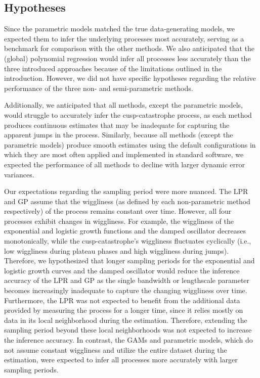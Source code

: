 \documentclass[man, floatsintext]{apa7}
\begin{document}
\subsection{Hypotheses}

Since the parametric models matched the true data-generating models, we
expected them to infer the underlying processes most accurately, serving as a
benchmark for comparison with the other methods. We also anticipated that the
(global) polynomial regression would infer all processes less accurately than
the three introduced approaches because of the limitations outlined in the
introduction. However, we did not have specific hypotheses regarding the
relative performance of the three non- and semi-parametric methods.

Additionally, we anticipated that all methods, except the parametric models,
would struggle to accurately infer the cusp-catastrophe process, as each method
produces continuous estimates that may be inadequate for capturing the apparent
jumps in the process. Similarly, because all methods (except the parametric
models) produce smooth estimates using the default configurations in which they
are most often applied and implemented in standard software, we expected the
performance of all methods to decline with larger dynamic error variances.

Our expectations regarding the sampling period were more nuanced. The LPR and
GP assume that the wiggliness (as defined by each non-parametric method
respectively) of the process remains constant over time. However, all four
processes exhibit changes in wiggliness. For example, the wiggliness of the
exponential and logistic growth functions and the damped oscillator decreases
monotonically, while the cusp-catastrophe's wiggliness fluctuates cyclically
(i.e., low wiggliness during plateau phases and high wiggliness during jumps).
Therefore, we hypothesized that longer sampling periods for the exponential and
logistic growth curves and the damped oscillator would reduce the inference
accuracy of the LPR and GP as the single bandwidth or lengthscale parameter
becomes increasingly inadequate to capture the changing wiggliness over time.
Furthermore, the LPR was not expected to benefit from the additional
data provided by measuring the process for a longer time, since it relies
mostly on data in its local neighborhood during the estimation. Therefore,
extending the sampling period beyond these local neighborhoods was not expected
to increase the inference accuracy. In contrast, the GAMs and parametric
models, which do not assume constant wiggliness and utilize the entire dataset
during the estimation, were expected to infer all processes more accurately
with larger sampling periods.
\end{document}
